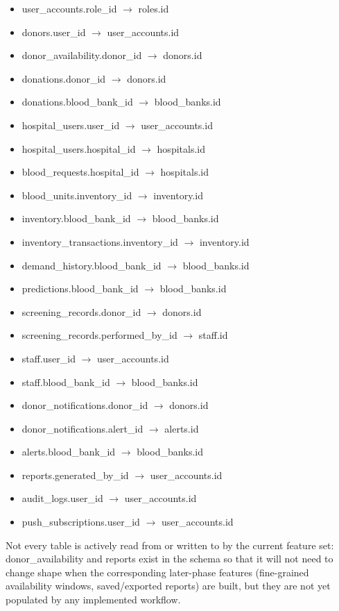 \documentclass[12pt,a4paper,twoside]{report}
\begin{document}
\begin{itemize}
\item user\_accounts.role\_id $\rightarrow$ roles.id
\item donors.user\_id $\rightarrow$ user\_accounts.id
\item donor\_availability.donor\_id $\rightarrow$ donors.id
\item donations.donor\_id $\rightarrow$ donors.id
\item donations.blood\_bank\_id $\rightarrow$ blood\_banks.id
\item hospital\_users.user\_id $\rightarrow$ user\_accounts.id
\item hospital\_users.hospital\_id $\rightarrow$ hospitals.id
\item blood\_requests.hospital\_id $\rightarrow$ hospitals.id
\item blood\_units.inventory\_id $\rightarrow$ inventory.id
\item inventory.blood\_bank\_id $\rightarrow$ blood\_banks.id
\item inventory\_transactions.inventory\_id $\rightarrow$ inventory.id
\item demand\_history.blood\_bank\_id $\rightarrow$ blood\_banks.id
\item predictions.blood\_bank\_id $\rightarrow$ blood\_banks.id
\item screening\_records.donor\_id $\rightarrow$ donors.id
\item screening\_records.performed\_by\_id $\rightarrow$ staff.id
\item staff.user\_id $\rightarrow$ user\_accounts.id
\item staff.blood\_bank\_id $\rightarrow$ blood\_banks.id
\item donor\_notifications.donor\_id $\rightarrow$ donors.id
\item donor\_notifications.alert\_id $\rightarrow$ alerts.id
\item alerts.blood\_bank\_id $\rightarrow$ blood\_banks.id
\item reports.generated\_by\_id $\rightarrow$ user\_accounts.id
\item audit\_logs.user\_id $\rightarrow$ user\_accounts.id
\item push\_subscriptions.user\_id $\rightarrow$ user\_accounts.id
\end{itemize}
Not every table is actively read from or written to by the current feature set: donor\_availability and reports exist in the schema so that it will not need to change shape when the corresponding later-phase features (fine-grained availability windows, saved/exported reports) are built, but they are not yet populated by any implemented workflow.
\end{document}
